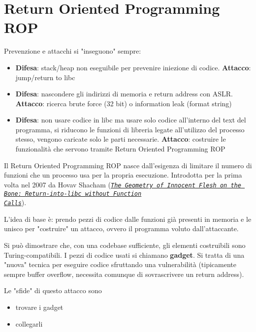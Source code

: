 \section{Return Oriented Programming ROP}
\label{sec:rop}

Prevenzione e attacchi si "inseguono" sempre:
\begin{itemize}
	\item \textbf{Difesa}: stack/heap non eseguibile per prevenire iniezione di codice. \textbf{Attacco}: jump/return to libc
    
	\item \textbf{Difesa}: nascondere gli indirizzi di memoria e return address con ASLR. \textbf{Attacco}: ricerca brute force (32 bit) o information leak (format string)
	
    \item \textbf{Difesa}: non usare codice in libc ma usare solo codice all'interno del text del programma, si riducono le funzioni di libreria legate all'utilizzo del processo stesso, vengono caricate solo le parti necessarie. \textbf{Attacco}: costruire le funzionalità che servono tramite Return Oriented Programming ROP
\end{itemize}

Il Return Oriented Programming ROP nasce dall'esigenza di limitare il numero di funzioni che un processo usa per la propria esecuzione. Introdotta per la prima volta nel 2007 da Hovav Shacham (\href{https://www.ush.it/team/ascii/geometry.pdf}{\textit{\texttt{The Geometry of Innocent Flesh on the Bone: Return-into-libc without Function \\ Calls}}}).

L'idea di base è: prendo pezzi di codice dalle funzioni già presenti in memoria e le unisco per "costruire" un attacco, ovvero il programma voluto dall'attaccante. 

Si può dimostrare che, con una codebase sufficiente, gli elementi costruibili sono Turing-compatibili. I pezzi di codice usati si chiamano \textbf{gadget}. Si tratta di una "nuova" tecnica per eseguire codice sfruttando una vulnerabilità (tipicamente sempre buffer overflow, necessita comunque di sovrascrivere un return address).

Le "sfide" di questo attacco sono 
\begin{itemize}
	\item trovare i gadget
    
	\item collegarli
\end{itemize}

